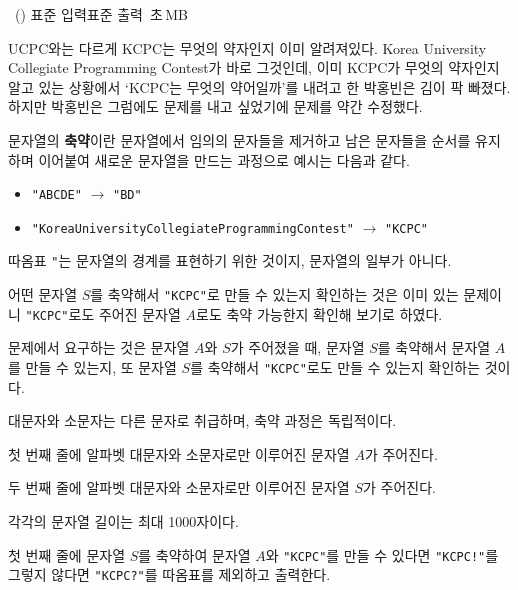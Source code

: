 \begin{problem}{\kcpcprobacronym\ (\kcpcprobacronymshort)}
    {표준 입력}{표준 출력}
    {\kcpcprobacronymtime\,초}{\kcpcprobacronymmemory\,MB}{}
    
    UCPC와는 다르게 KCPC는 무엇의 약자인지 이미 알려져있다. Korea University Collegiate Programming Contest가 바로 그것인데, 이미 KCPC가 무엇의 약자인지 알고 있는 상황에서 `KCPC는 무엇의 약어일까'를 내려고 한 박홍빈은 김이 팍 빠졌다. 하지만 박홍빈은 그럼에도 문제를 내고 싶었기에 문제를 약간 수정했다. 
    
    문자열의 \textbf{축약}이란 문자열에서 임의의 문자들을 제거하고 남은 문자들을 순서를 유지하며 이어붙여 새로운 문자열을 만드는 과정으로 예시는 다음과 같다.
    
    \begin{itemize}
    \item \texttt{"ABCDE"} $ \to $ \texttt{"BD"}
    \item \texttt{"KoreaUniversityCollegiateProgrammingContest"} $ \to $ \texttt{"KCPC"}
    \end{itemize}
    
    따옴표 \texttt{"}는 문자열의 경계를 표현하기 위한 것이지, 문자열의 일부가 아니다.
    
    어떤 문자열 $ S $를 축약해서 \texttt{"KCPC"}로 만들 수 있는지 확인하는 것은 이미 있는 문제이니 \texttt{"KCPC"}로도 주어진 문자열 $ A $로도 축약 가능한지 확인해 보기로 하였다.
    
    문제에서 요구하는 것은 문자열 $ A $와 $ S $가 주어졌을 때, 문자열 $ S $를 축약해서 문자열 $ A $를 만들 수 있는지, 또 문자열 $ S $를 축약해서 \texttt{"KCPC"}로도 만들 수 있는지 확인하는 것이다.
    
    대문자와 소문자는 다른 문자로 취급하며, 축약 과정은 독립적이다.
    
    \InputFile
    첫 번째 줄에 알파벳 대문자와 소문자로만 이루어진 문자열 $ A $가 주어진다.
    
    두 번째 줄에 알파벳 대문자와 소문자로만 이루어진 문자열 $ S $가 주어진다. 
    
    각각의 문자열 길이는 최대 1000자이다.
    
    \OutputFile
    첫 번째 줄에 문자열 $ S $를 축약하여 문자열 $ A $와 \texttt{"KCPC"}를 만들 수 있다면 \texttt{"KCPC!"}를 그렇지 않다면 \texttt{"KCPC?"}를 따옴표를 제외하고 출력한다.
    
    \Examples
    \begin{example}
    \end{example}
    

\end{problem}
